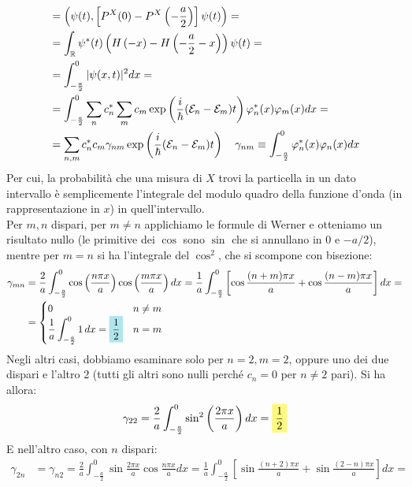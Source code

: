 \documentclass[../../FisicaTeorica.tex]{subfiles}
\begin{document}
\begin{enumerate}
\begin{align*}
&=\left(\psi(t), \left[P^X(0)-P^X\left(-\frac{a}{2}\right)\right]\psi(t)\right)=\\
&= \int_{\mathbb{R}}\psi^*(t)\left (H\left(-x\right)-H\left(-\frac{a}{2}-x\right)\right)\psi(t)=\\
&=\int_{-\frac{a}{2}}^{0} |\psi(x,t)|^2 dx=\\
&= \int_{-\frac{a}{2}}^0 \sum_n c_n^* \sum_m c_m \exp\left(\frac{i}{\hbar}(\mathcal{E}_n-\mathcal{E}_m)t\right)\varphi_n^*(x)\varphi_m(x)dx=\\
&=\sum_{n,m}c_n^* c_m \gamma_{nm}\exp\left(\frac{i}{\hbar}(\mathcal{E}_n-\mathcal{E}_m)t\right) \quad \gamma_{nm}\equiv \int_{-\frac{a}{2}}^0 \varphi_n^*(x) \varphi_n(x) dx 
\end{align*}
Per cui, la probabilità che una misura di $X$ trovi la particella in un dato intervallo è semplicemente l'integrale del modulo quadro della funzione d'onda (in rappresentazione in $x$) in quell'intervallo.\\
Per $m,n$ dispari, per $m\neq n$ applichiamo le formule di Werner e otteniamo un risultato nullo (le primitive dei $\cos$ sono $\sin$ che si annullano in $0$ e $-a/2$), mentre per $m=n$ si ha l'integrale del $\cos^2$, che si scompone con bisezione:
\begin{align*}
\gamma_{mn}&=\frac{2}{a}\int_{-\frac{a}{2}}^0 \cos\left( \frac{n\pi x}{a}\right)\cos\left( \frac{m\pi x}{a}\right)dx=\frac{1}{a}\int_{-\frac{a}{2}}^{0} \left[
\cos\frac{(n+m)\pi x}{a}+ \cos\frac{(n-m)\pi x}{a}
\right]dx=\\
&=\begin{cases}
0 & n\neq m\\
\displaystyle
\frac{1}{a}\int_{-\frac{a}{2}}^0 1\, dx=\hlc{SkyBlue}{\frac{1}{2}} & n=m
\end{cases}
\end{align*}
Negli altri casi, dobbiamo esaminare solo per $n=2,m=2$, oppure uno dei due dispari e l'altro $2$ (tutti gli altri sono nulli perché $c_n=0$ per $n\neq 2$ pari). Si ha allora:
\begin{align*}
\gamma_{22} =\frac{2}{a}\int_{-\frac{a}{2}}^0 \sin^2\left(\frac{2\pi x}{a}\right)dx=\hlc{Yellow}{\frac{1}{2}}
\end{align*}
E nell'altro caso, con $n$ dispari:
\begin{align*}
\gamma_{2n}&=\gamma_{n2}=\frac{2}{a}\int_{-\frac{a}{2}}^0 \sin\frac{2\pi x}{a}\cos \frac{n\pi x}{a} dx=\frac{1}{a}\int_{-\frac{a}{2}}^0 \left[
\sin\frac{(n+2)\pi x}{a}+\sin\frac{(2-n)\pi x}{a}
\right]dx=\\

\end{align*}
\end{enumerate}
\end{document}
